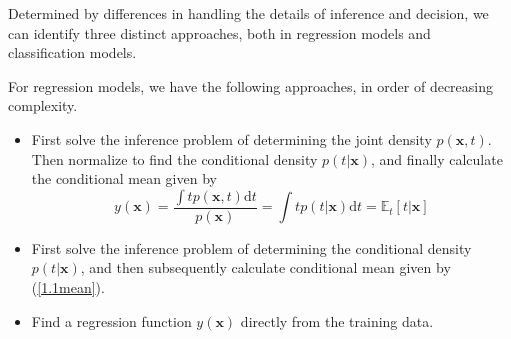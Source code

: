 \documentclass[a4paper]{report}
\newcommand{\ud}{\mathrm{d}}
\renewcommand{\bf}{\mathbf}
\newcommand{\bb}{\mathbb}
\begin{document}
Determined by differences in handling the details of inference and decision, we can identify three distinct approaches, both in regression models and classification models. 

For regression models, we have the following approaches, in order of decreasing complexity.
\begin{itemize}
\item First solve the inference problem of determining the joint density $p(\bf{x},t)$. Then normalize to find the conditional density $p(t|\bf{x})$, and finally calculate the conditional mean given by 
\begin{equation}
	y(\bf{x})=\frac{\int tp(\bf{x},t)\ud t}{p(\bf{x})}=\int tp(t|\bf{x})\ud t = \bb{E}_t[t|\bf{x}] \label{1.1mean}
\end{equation}
\item First solve the inference problem of determining the conditional density $p(t|\bf{x})$, and then subsequently calculate conditional mean given by (\ref{1.1mean}).
\item Find a regression function $y(\bf{x})$ directly from the training data.
\end{itemize}
\end{document}
